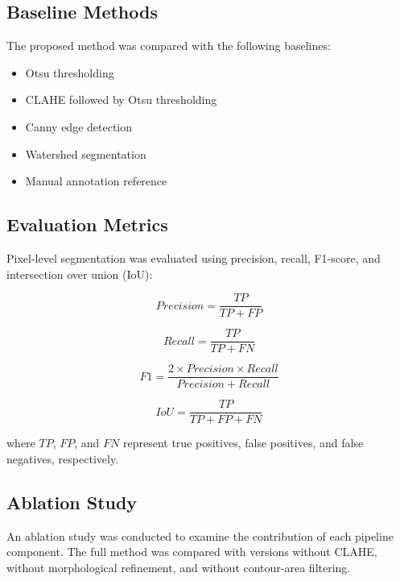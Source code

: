 \documentclass[pdflatex,sn-mathphys-num,iicol]{sn-jnl}
\theoremstyle{thmstyleone}
\theoremstyle{thmstyletwo}
\theoremstyle{thmstylethree}
\begin{document}
\subsection{Baseline Methods}\label{subsec:baselines}

The proposed method was compared with the following baselines:

\begin{itemize}
\item Otsu thresholding
\item CLAHE followed by Otsu thresholding
\item Canny edge detection
\item Watershed segmentation
\item Manual annotation reference
\end{itemize}

\subsection{Evaluation Metrics}\label{subsec:metrics}

Pixel-level segmentation was evaluated using precision, recall,
F1-score, and intersection over union (IoU):

\begin{equation}
Precision = \frac{TP}{TP + FP}
\label{eq:precision}
\end{equation}

\begin{equation}
Recall = \frac{TP}{TP + FN}
\label{eq:recall}
\end{equation}

\begin{equation}
F1 = \frac{2 \times Precision \times Recall}{Precision + Recall}
\label{eq:f1}
\end{equation}

\begin{equation}
IoU = \frac{TP}{TP + FP + FN}
\label{eq:iou}
\end{equation}

where $TP$, $FP$, and $FN$ represent true positives, false positives,
and false negatives, respectively.

\subsection{Ablation Study}\label{subsec:ablation}

An ablation study was conducted to examine the contribution of each
pipeline component. The full method was compared with versions without
CLAHE, without morphological refinement, and without contour-area
filtering.
\end{document}
